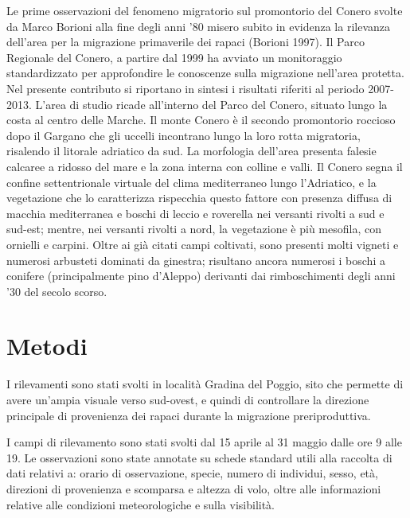 Le prime osservazioni del fenomeno migratorio sul promontorio del Conero
svolte da Marco Borioni alla fine degli anni {\textquoteright}80 misero
subito in evidenza la rilevanza dell{\textquoteright}area per la
migrazione primaverile dei rapaci (Borioni 1997). Il Parco Regionale
del Conero, a partire dal 1999 ha avviato un monitoraggio
standardizzato per approfondire le conoscenze sulla migrazione
nell{\textquoteright}area protetta. Nel presente contributo si
riportano in sintesi i risultati riferiti al periodo 2007-2013. 
L{\textquoteright}area di studio ricade all{\textquoteright}interno del
Parco del Conero, situato lungo la costa al centro delle Marche. Il
monte Conero \`e il secondo promontorio roccioso dopo il Gargano che
gli uccelli incontrano lungo la loro rotta migratoria, risalendo il
litorale adriatico da sud. La morfologia dell{\textquoteright}area
presenta falesie calcaree a ridosso del mare e la zona interna con
colline e valli. Il Conero segna il confine settentrionale virtuale del
clima mediterraneo lungo l{\textquoteright}Adriatico, e la vegetazione
che lo caratterizza rispecchia questo fattore con presenza diffusa di
macchia mediterranea e boschi di leccio e roverella nei versanti
rivolti a sud e sud-est; mentre, nei versanti rivolti a nord, la
vegetazione \`e pi\`u mesofila, con ornielli e carpini. Oltre ai gi\`a
citati campi coltivati, sono presenti molti vigneti e numerosi
arbusteti dominati da ginestra; risultano ancora numerosi i boschi a
conifere (principalmente pino d{\textquoteright}Aleppo) derivanti dai
rimboschimenti degli anni {\textquoteright}30 del secolo scorso.

\section*{Metodi}

I rilevamenti sono stati svolti in localit\`a Gradina del Poggio, sito
che permette di avere un{\textquoteright}ampia visuale verso sud-ovest,
e quindi di controllare la direzione principale di provenienza dei
rapaci durante la migrazione preriproduttiva.

I campi di rilevamento sono stati svolti dal 15 aprile al 31 maggio
dalle ore 9 alle 19. Le osservazioni sono state annotate su schede
standard utili alla raccolta di dati relativi a: orario di
osservazione, specie, numero di individui, sesso, et\`a, direzioni di
provenienza e scomparsa e altezza di volo, oltre alle informazioni
relative alle condizioni meteorologiche e sulla visibilit\`a.

